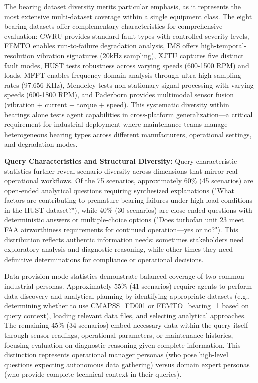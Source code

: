 \documentclass[sigconf,review]{acmart}
\begin{document}
The bearing dataset diversity merits particular emphasis, as it represents the most extensive multi-dataset coverage within a single equipment class. The eight bearing datasets offer complementary characteristics for comprehensive evaluation: CWRU provides standard fault types with controlled severity levels, FEMTO enables run-to-failure degradation analysis, IMS offers high-temporal-resolution vibration signatures (20kHz sampling), XJTU captures five distinct fault modes, HUST tests robustness across varying speeds (600-1500 RPM) and loads, MFPT enables frequency-domain analysis through ultra-high sampling rates (97.656 KHz), Mendeley tests non-stationary signal processing with varying speeds (600-1800 RPM), and Paderborn provides multimodal sensor fusion (vibration + current + torque + speed). This systematic diversity within bearings alone tests agent capabilities in cross-platform generalization---a critical requirement for industrial deployment where maintenance teams manage heterogeneous bearing types across different manufacturers, operational settings, and degradation modes.

\textbf{Query Characteristics and Structural Diversity:} Query characteristic statistics further reveal scenario diversity across dimensions that mirror real operational workflows. Of the 75 scenarios, approximately 60\% (45 scenarios) are open-ended analytical questions requiring synthesized explanations ("What factors are contributing to premature bearing failures under high-load conditions in the HUST dataset?"), while 40\% (30 scenarios) are close-ended questions with deterministic answers or multiple-choice options ("Does turbofan unit 23 meet FAA airworthiness requirements for continued operation---yes or no?"). This distribution reflects authentic information needs: sometimes stakeholders need exploratory analysis and diagnostic reasoning, while other times they need definitive determinations for compliance or operational decisions.

Data provision mode statistics demonstrate balanced coverage of two common industrial personas. Approximately 55\% (41 scenarios) require agents to perform data discovery and analytical planning by identifying appropriate datasets (e.g., determining whether to use CMAPSS\_FD001 or FEMTO\_bearing\_1 based on query context), loading relevant data files, and selecting analytical approaches. The remaining 45\% (34 scenarios) embed necessary data within the query itself through sensor readings, operational parameters, or maintenance histories, focusing evaluation on diagnostic reasoning given complete information. This distinction represents operational manager personas (who pose high-level questions expecting autonomous data gathering) versus domain expert personas (who provide complete technical context in their queries).
\end{document}
